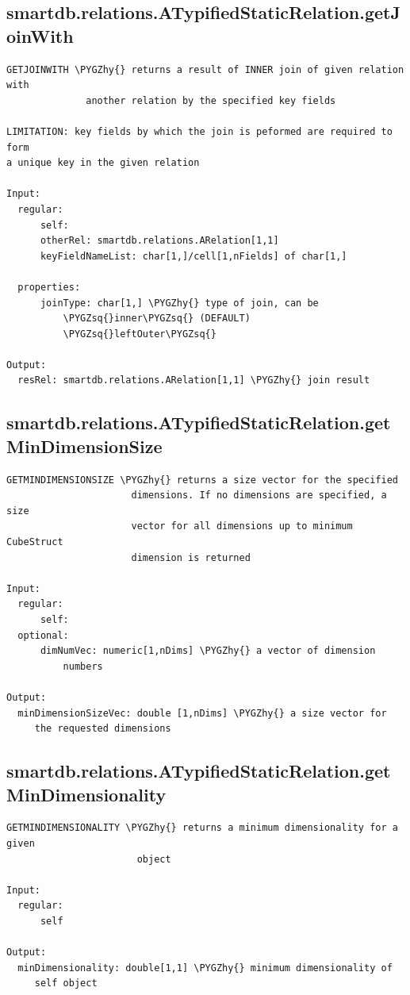 \documentclass[letterpaper,10pt,english]{sphinxmanual}
\def\PYGZhy{\char`\-}
\def\PYGZsq{\char`\'}
\begin{document}
\subsection{smartdb.relations.ATypifiedStaticRelation.getJoinWith}
\label{chap_functions:smartdb-relations-atypifiedstaticrelation-getjoinwith}
\begin{Verbatim}[commandchars=\\\{\}]
GETJOINWITH \PYGZhy{} returns a result of INNER join of given relation with
              another relation by the specified key fields

LIMITATION: key fields by which the join is peformed are required to form
a unique key in the given relation

Input:
  regular:
      self:
      otherRel: smartdb.relations.ARelation[1,1]
      keyFieldNameList: char[1,]/cell[1,nFields] of char[1,]

  properties:
      joinType: char[1,] \PYGZhy{} type of join, can be
          \PYGZsq{}inner\PYGZsq{} (DEFAULT)
          \PYGZsq{}leftOuter\PYGZsq{}

Output:
  resRel: smartdb.relations.ARelation[1,1] \PYGZhy{} join result
\end{Verbatim}


\subsection{smartdb.relations.ATypifiedStaticRelation.getMinDimensionSize}
\label{chap_functions:smartdb-relations-atypifiedstaticrelation-getmindimensionsize}
\begin{Verbatim}[commandchars=\\\{\}]
GETMINDIMENSIONSIZE \PYGZhy{} returns a size vector for the specified
                      dimensions. If no dimensions are specified, a size
                      vector for all dimensions up to minimum CubeStruct
                      dimension is returned

Input:
  regular:
      self:
  optional:
      dimNumVec: numeric[1,nDims] \PYGZhy{} a vector of dimension
          numbers

Output:
  minDimensionSizeVec: double [1,nDims] \PYGZhy{} a size vector for
     the requested dimensions
\end{Verbatim}


\subsection{smartdb.relations.ATypifiedStaticRelation.getMinDimensionality}
\label{chap_functions:smartdb-relations-atypifiedstaticrelation-getmindimensionality}
\begin{Verbatim}[commandchars=\\\{\}]
GETMINDIMENSIONALITY \PYGZhy{} returns a minimum dimensionality for a given
                       object

Input:
  regular:
      self

Output:
  minDimensionality: double[1,1] \PYGZhy{} minimum dimensionality of
     self object
\end{Verbatim}
\end{document}
